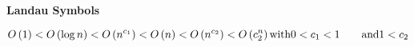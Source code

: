\question \textbf{Landau Symbols}



\begin{solution}
\begin{equation*}
O\left(1\right) < O\left(\log n\right) < O\left(n^{c_1}\right) < O\left(n\right) < O\left(n^{c_2}\right) < O\left(c_2^n\right)\\
\text{with} 0 < c_1 < 1\qquad \text{and} 1 < c_2
\end{equation*}
\end{solution}


